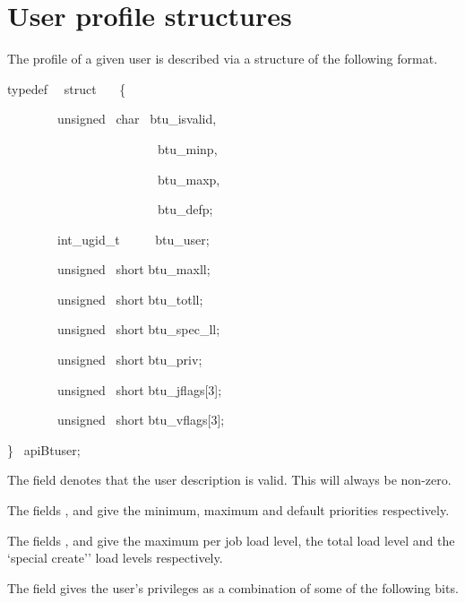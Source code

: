 \chapter{User profile structures}
\label{chp:user-profile-structures}
\label{bkm:Userstructure}The profile of a given user is described via a structure of the following format.

\begin{expara}

typedef \ \ struct \ \ \ \{

\ \ \ \ \ \ \ \ unsigned \ char \ btu\_isvalid,

\ \ \ \ \ \ \ \ \ \ \ \ \ \ \ \ \ \ \ \ \ \ \ \ btu\_minp,

\ \ \ \ \ \ \ \ \ \ \ \ \ \ \ \ \ \ \ \ \ \ \ \ btu\_maxp,

\ \ \ \ \ \ \ \ \ \ \ \ \ \ \ \ \ \ \ \ \ \ \ \ btu\_defp;

\ \ \ \ \ \ \ \ int\_ugid\_t \ \ \ \ \ btu\_user;

\ \ \ \ \ \ \ \ unsigned \ short btu\_maxll;

\ \ \ \ \ \ \ \ unsigned \ short btu\_totll;

\ \ \ \ \ \ \ \ unsigned \ short btu\_spec\_ll;

\ \ \ \ \ \ \ \ unsigned \ short btu\_priv;

\ \ \ \ \ \ \ \ unsigned \ short btu\_jflags[3];

\ \ \ \ \ \ \ \ unsigned \ short btu\_vflags[3];

\} \ apiBtuser;

\end{expara}

The field  denotes that the user description is valid. This will always be non-zero.

The fields ,  and  give the minimum, maximum and default
priorities respectively.

The fields ,  and  give the maximum per job load level, the total load level and the
`special create'' load levels respectively.

The field  gives the user's privileges as a combination of some of the following bits.

